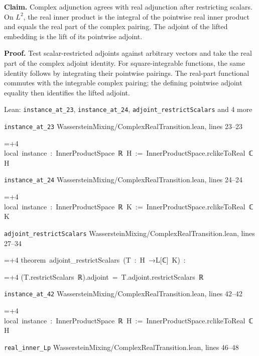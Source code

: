 \documentclass[11pt,a4paper]{report}
\newlength{\leancharwidth}
\newenvironment{leancode}{\par\smallskip\begingroup\ttfamily\footnotesize\raggedright
  \settowidth{\leancharwidth}{M}\setlength{\parskip}{0pt}\setlength{\parindent}{0pt}
  \frenchspacing}{\par\endgroup\smallskip}
\newcommand{\leanline}[2]{\hangindent=\dimexpr#1\leancharwidth+4\leancharwidth\relax
  \hangafter=1\noindent\hspace*{#1\leancharwidth}#2\par}
\newcommand{\leansource}[1]{\par{\footnotesize\color{leanmuted}#1}\par}
\begin{document}
\textbf{Claim.} Complex adjunction agrees with real adjunction after restricting scalars. On \(L^2\), the real inner product is the integral of the pointwise real inner product and equals the real part of the complex pairing. The adjoint of the lifted embedding is the lift of its pointwise adjoint.



\textbf{Proof.} Test scalar-restricted adjoints against arbitrary vectors and take the real part of the complex adjoint identity. For square-integrable functions, the same identity follows by integrating their pointwise pairings. The real-part functional commutes with the integrable complex pairing; the defining pointwise adjoint equality then identifies the lifted adjoint.

\begin{leanbox}{Lean: \texttt{instance\_\allowbreak{}at\_\allowbreak{}23}, \texttt{instance\_\allowbreak{}at\_\allowbreak{}24}, \texttt{adjoint\_\allowbreak{}restrictScalars} and 4 more}
\leansource{\texttt{instance\_\allowbreak{}at\_\allowbreak{}23} \quad WassersteinMixing/\allowbreak{}ComplexRealTransition.lean, lines 23–23}
\begin{leancode}
\leanline{0}{local\ instance\ :\ InnerProductSpace\ ℝ\ H\ :=\ InnerProductSpace.rclikeToReal\ ℂ\ H}
\end{leancode}
\leansource{\texttt{instance\_\allowbreak{}at\_\allowbreak{}24} \quad WassersteinMixing/\allowbreak{}ComplexRealTransition.lean, lines 24–24}
\begin{leancode}
\leanline{0}{local\ instance\ :\ InnerProductSpace\ ℝ\ K\ :=\ InnerProductSpace.rclikeToReal\ ℂ\ K}
\end{leancode}
\leansource{\texttt{adjoint\_\allowbreak{}restrictScalars} \quad WassersteinMixing/\allowbreak{}ComplexRealTransition.lean, lines 27–34}
\begin{leancode}
\leanline{0}{theorem\ adjoint\_restrictScalars\ (T\ :\ H\ →L[ℂ]\ K)\ :}
\leanline{4}{(T.restrictScalars\ ℝ).adjoint\ =\ T.adjoint.restrictScalars\ ℝ}
\end{leancode}
\leansource{\texttt{instance\_\allowbreak{}at\_\allowbreak{}42} \quad WassersteinMixing/\allowbreak{}ComplexRealTransition.lean, lines 42–42}
\begin{leancode}
\leanline{0}{local\ instance\ :\ InnerProductSpace\ ℝ\ H\ :=\ InnerProductSpace.rclikeToReal\ ℂ\ H}
\end{leancode}
\leansource{\texttt{real\_\allowbreak{}inner\_\allowbreak{}Lp} \quad WassersteinMixing/\allowbreak{}ComplexRealTransition.lean, lines 46–48}

\end{leanbox}
\end{document}
